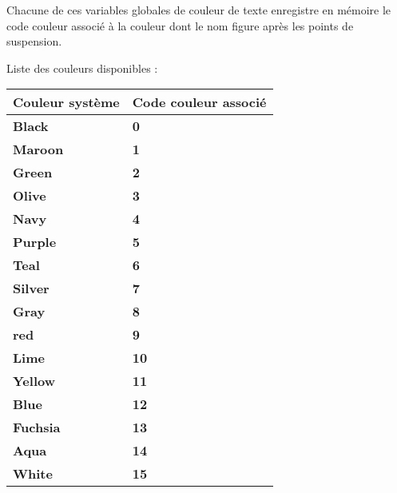 \documentclass[a4paper,10pt]{article}
\begin{document}
\begin{justify}
    Chacune de ces variables globales de couleur de texte enregistre en mémoire le code couleur associé à la couleur dont le nom figure après les points de suspension.
\end{justify}

\begin{justify}
    Liste des couleurs disponibles :

    \begin{tabular}{|l|l|}
        \hline
        \textbf{Couleur système} & \textbf{Code couleur associé}\\
        \hline
        \textbf{\color{text}Black} & \textbf{\color{text}0}\\
        \hline
        \textbf{\color{Maroon}Maroon} & \textbf{\color{Maroon}1}\\
        \hline
        \textbf{\color{Green}Green} & \textbf{\color{Green}2}\\
        \hline
        \textbf{\color{Olive}Olive} & \textbf{\color{Olive}3}\\
        \hline
        \textbf{\color{Navy}Navy} & \textbf{\color{Navy}4}\\
        \hline
        \textbf{\color{Purple}Purple} & \textbf{\color{Purple}5}\\
        \hline
        \textbf{\color{Teal}Teal} & \textbf{\color{Teal}6}\\
        \hline
        \textbf{\color{Silver}Silver} & \textbf{\color{Silver}7}\\
        \hline
        \textbf{\color{Gray}Gray} & \textbf{\color{Gray}8}\\
        \hline
        \textbf{\color{Red}red} & \textbf{\color{Red}9}\\
        \hline
        \textbf{\color{Lime}Lime} & \textbf{\color{Lime}10}\\
        \hline
        \textbf{\color{Yellow}Yellow} & \textbf{\color{Yellow}11}\\
        \hline
        \textbf{\color{Blue}Blue} & \textbf{\color{Blue}12}\\
        \hline
        \textbf{\color{Fuchsia}Fuchsia} & \textbf{\color{Fuchsia}13}\\
        \hline
        \textbf{\color{Aqua}Aqua} & \textbf{\color{Aqua}14}\\
        \hline
        \textbf{\color{text}White} & \textbf{\color{text}15}\\
        \hline
    \end{tabular}


\end{justify}
\end{document}
